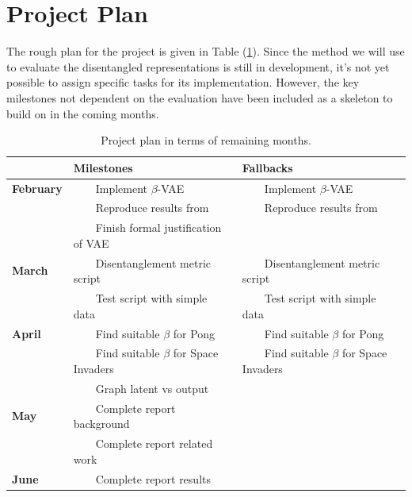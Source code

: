 \documentclass[12pt,twoside]{article}
\begin{document}
\newpage
\section{Project Plan}
The rough plan for the project is given in Table (\ref{tab:project_plan}). Since the method we will use to evaluate the disentangled representations is still in development, it's not yet possible to assign specific tasks for its implementation. However, the key milestones not dependent on the evaluation have been included as a skeleton to build on in the coming months.\\

\newcommand{\tabitem}{~~\llap{\textbullet}~~}
\begin{table}[h!]
\centering
\caption{Project plan in terms of remaining months.}
\label{tab:project_plan}
\begin{tabular}{@{}lll@{}}
\toprule
                  & \textbf{Milestones}                 & \textbf{Fallbacks}             \\ \midrule
\textbf{February} & \tabitem Implement $\beta$-VAE      & \tabitem Implement $\beta$-VAE \\
                  & \tabitem Reproduce results from \cite{Higgins2016} & \tabitem Reproduce results from \cite{Higgins2016}\\
                  & \tabitem Finish formal justification of VAE &  \\
\textbf{March}    & \tabitem Disentanglement metric script & \tabitem Disentanglement metric script \\
                  & \tabitem Test script with simple data & \tabitem Test script with simple data   \\
\textbf{April}    & \tabitem Find suitable $\beta$ for Pong & \tabitem Find suitable $\beta$ for Pong \\
                  & \tabitem Find suitable $\beta$ for Space Invaders & \tabitem Find suitable $\beta$ for Space Invaders \\
                  & \tabitem Graph latent vs output &                    \\                  
\textbf{May}      & \tabitem Complete report background & \\
                  & \tabitem Complete report related work &                    \\                  
\textbf{June}     & \tabitem Complete report results      &                    \\ \bottomrule
\end{tabular}
\end{table}
\end{document}
